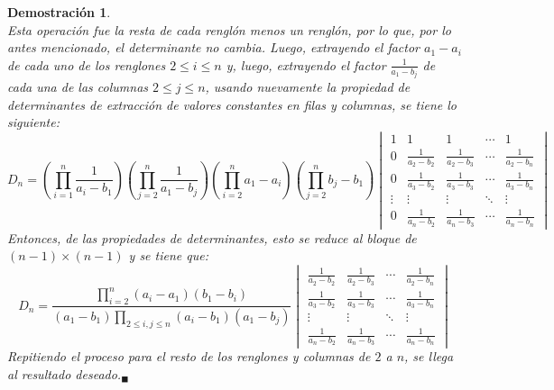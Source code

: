 \documentclass[a4paper,11pt]{article}
\theoremstyle{teoremas}
\theoremstyle{ejemplos}
\theoremstyle{definiciones}
\theoremstyle{lemas}
\newtheorem*{demostracion}{Demostraci\'on}
\begin{document}
\begin{demostracion}
\begin{equation*}
 \end{equation*}
 Esta operaci\'on fue la resta de cada rengl\'on menos un rengl\'on, por lo que, por lo antes mencionado, el determinante no cambia.
 Luego, extrayendo el factor $a_1 - a_i$ de cada uno de los renglones $2 \leq i \leq n$ y, luego, extrayendo el factor $\frac{1}{a_1 - b_j}$ de cada una de las columnas $2 \leq j \leq n$, usando nuevamente la propiedad de determinantes de extracci\'on de valores constantes en filas y columnas, se tiene lo siguiente:
 \begin{equation*}
  D_n = \left( \prod_{i=1}^n \frac{1}{a_i - b_1} \right) \left( \prod_{j=2}^n \frac{1}{a_1 - b_j} \right) \left( \prod_{i=2}^n a_1 - a_i \right) \left( \prod_{j=2}^n b_j - b_1 \right)
  \begin{vmatrix}
   1 & 1 & 1 & \cdots & 1 \\ 
   0 & \displaystyle{\frac{1}{a_2 - b_2}} & \displaystyle{\frac{1}{a_2 - b_3}} & \cdots & \displaystyle{\frac{1}{a_2 - b_n}} \\ 
   0 & \displaystyle{\frac{1}{a_3 - b_2}} & \displaystyle{\frac{1}{a_3 - b_3}} & \cdots & \displaystyle{\frac{1}{a_3 - b_n}} \\
   \vdots & \vdots & \vdots & \ddots & \vdots \\
   0 & \displaystyle{\frac{1}{a_n - b_2}} & \displaystyle{\frac{1}{a_n - b_3}} & \cdots & \displaystyle{\frac{1}{a_n - b_n}}
  \end{vmatrix}
 \end{equation*}
 Entonces, de las propiedades de determinantes, esto se reduce al bloque de $(n-1) \times (n-1)$ y se tiene que:
 \begin{equation}
  D_n = \frac{\displaystyle{ \prod_{i=2}^n (a_i - a_1)(b_1 - b_i) }}{\displaystyle{ (a_1 - b_1) \prod_{2 \leq i,j \leq n} (a_i - b_1)(a_1 - b_j) }}
  \begin{vmatrix}
   \displaystyle{\frac{1}{a_2 - b_2}} & \displaystyle{\frac{1}{a_2 - b_3}} & \cdots & \displaystyle{\frac{1}{a_2 - b_n}} \\ 
   \displaystyle{\frac{1}{a_3 - b_2}} & \displaystyle{\frac{1}{a_3 - b_3}} & \cdots & \displaystyle{\frac{1}{a_3 - b_n}} \\
   \vdots & \vdots & \ddots & \vdots \\
   \displaystyle{\frac{1}{a_n - b_2}} & \displaystyle{\frac{1}{a_n - b_3}} & \cdots & \displaystyle{\frac{1}{a_n - b_n}}
  \end{vmatrix}
 \end{equation}
 Repitiendo el proceso para el resto de los renglones y columnas de $2$ a $n$, se llega al resultado deseado.${}_{\blacksquare}$
 
\end{demostracion}
\end{document}
